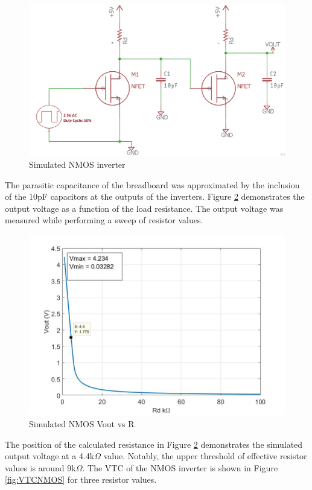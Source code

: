 \begin{figure}[H]
    \centering
    \includegraphics[scale = .25]{CircuitDevelopment/NMOS/DuelNMOS.png}
    \caption{Simulated NMOS inverter}
    \label{fig:simcircuit}
\end{figure}

The parasitic capacitance of the breadboard was approximated by the inclusion of the 10pF capacitors at the outputs of the inverters. Figure \ref{fig:NMOSvsR} demonstrates the output voltage as a function of the load resistance. The output voltage was measured while performing a sweep of resistor values.

\begin{figure}[H]
    \centering
    \includegraphics[scale = .30]{CircuitDevelopment/NMOS/voutvsrd_nmos_inverter.jpg}
    \caption{Simulated NMOS Vout vs R}
    \label{fig:NMOSvsR}
\end{figure}

The position of the calculated resistance in Figure \ref{fig:NMOSvsR} demonstrates the simulated output voltage at a 4.4k$\Omega$ value. Notably, the upper threshold of effective resistor values is around 9k$\Omega$. The VTC of the NMOS inverter is shown in Figure \ref{fig:VTCNMOS} for three resistor values.

